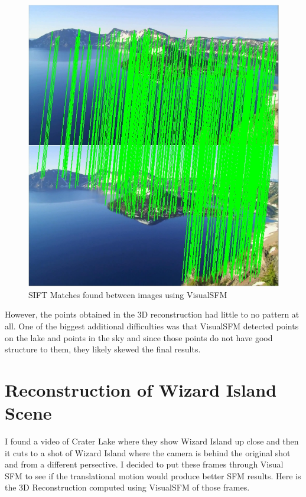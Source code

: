 \documentclass[11pt,psfig]{article}
\begin{document}
\begin{figure}[H]
\centering
\includegraphics[width=\columnwidth]{sfmResults1/shot14_26_siftMatches.jpg}
\caption{SIFT Matches found between images using VisualSFM}
\end{figure}
However, the points obtained in the 3D reconstruction had little to no pattern at all. One of the biggest additional difficulties was that VisualSFM detected points on the lake and points in the sky and since those points do not have good structure to them, they likely skewed the final results. 


\section{Reconstruction of Wizard Island Scene}

I found a video of Crater Lake where they show Wizard Island up close and then it cuts to a shot of Wizard Island where the camera is behind the original shot and from a different persective. I decided to put these frames through Visual SFM to see if the translational motion would produce better SFM results. Here is the 3D Reconstruction computed using VisualSFM of those frames. 
\end{document}
